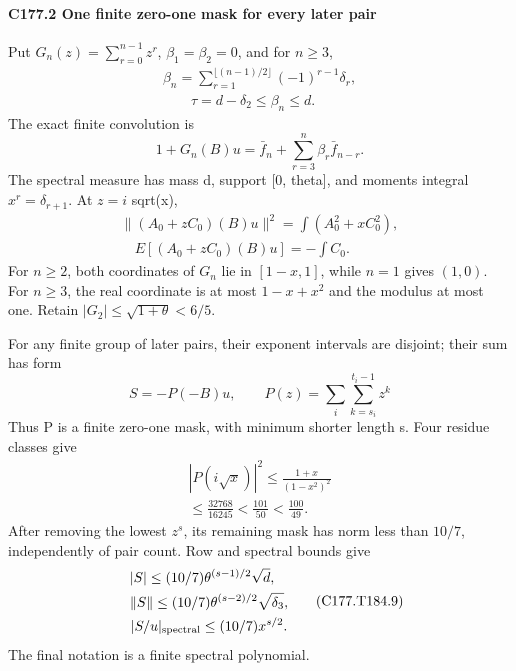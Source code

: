 \paragraph{C177.2 One finite zero-one mask for every later pair}

Put \(G_n(z)=\sum_{r=0}^{n-1}z^r\), \(\beta_1=\beta_2=0\), and for \(n\ge3\),
\[
\begin{gathered}
\beta_n=\sum_{r=1}^{\lfloor(n-1)/2\rfloor}(-1)^{r-1}\delta_r,\\
\qquad\tau=d-\delta_2\le\beta_n\le d.
\end{gathered}
\]
The exact finite convolution is
\[
1+G_n(B)u=\bar f_n+\sum_{r=3}^n\beta_r \bar f_{n-r}.                \tag{C177.T184.6}
\]
The spectral measure has mass d, support [0, theta], and moments integral \(x^r=\delta_{r+1}.\) At \(z=i\) sqrt(x),
\[
\begin{gathered}
\|(A_0+zC_0)(B)u\|^2=\int(A_0^2+xC_0^2),\\
\quad E[(A_0+zC_0)(B)u]=-\int C_0.
\end{gathered}\tag{C177.T184.7}
\]
For \(n\ge2\), both coordinates of \(G_n\) lie in \([1-x,\allowbreak \allowbreak  1]\), while \(n=1\) gives \((1,\allowbreak \allowbreak  0)\). For \(n\ge3\), the real coordinate is at most \(1-x+x^2\) and the modulus at most one. Retain \(|G_2|\le\sqrt{1+\theta}<6/5\).

For any finite group of later pairs, their exponent intervals are disjoint; their sum has form
\[
S=-P(-B)u,\qquad P(z)=\sum_{i}\sum_{k=s_i}^{t_i-1}z^k
\]
Thus P is a finite zero-one mask, with minimum shorter length s. Four residue classes give
\[
\begin{gathered}
|P(i\sqrt x)|^2\le\frac{1+x}{(1-x^2)^2}\\
\le\frac{32768}{16245}<\frac{101}{50}<\frac{100}{49}.
\end{gathered}\tag{C177.T184.8}
\]
After removing the lowest \(z^s\), its remaining mask has norm less than \(10/7\), independently of pair count. Row and spectral bounds give
\[
\begin{gathered}
|S|\le(10/7)\theta^{(s-1)/2}\sqrt d,\\
\quad \|S\|\le(10/7)\theta^{(s-2)/2}\sqrt{\delta_3},\\
\quad |S/u|_{\rm spectral}\le(10/7)x^{s/2}.
\end{gathered}\tag{C177.T184.9}
\]
The final notation is a finite spectral polynomial.

